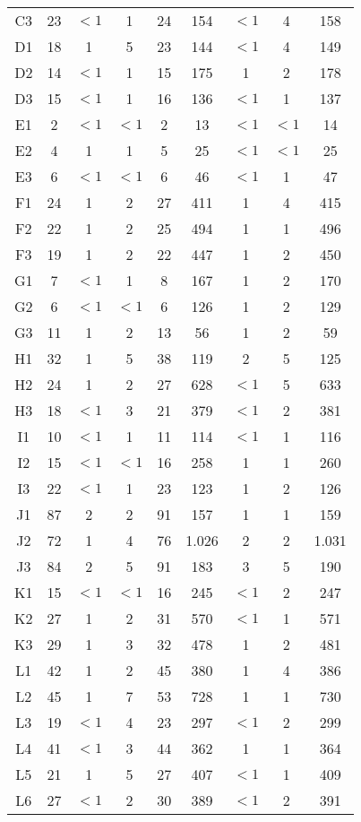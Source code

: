 \begin{center}
\begin{longtable}{ccccc|cccc}
C3&23&$<1$&1&24&154&$<1$&4&158\\
D1&18&1&5&23&144&$<1$&4&149\\
D2&14&$<1$&1&15&175&1&2&178\\
D3&15&$<1$&1&16&136&$<1$&1&137\\
E1&2&$<1$&$<1$&2&13&$<1$&$<1$&14\\
E2&4&1&1&5&25&$<1$&$<1$&25\\
E3&6&$<1$&$<1$&6&46&$<1$&1&47\\
F1&24&1&2&27&411&1&4&415\\
F2&22&1&2&25&494&1&1&496\\
F3&19&1&2&22&447&1&2&450\\
G1&7&$<1$&1&8&167&1&2&170\\
G2&6&$<1$&$<1$&6&126&1&2&129\\
G3&11&1&2&13&56&1&2&59\\
H1&32&1&5&38&119&2&5&125\\
H2&24&1&2&27&628&$<1$&5&633\\
H3&18&$<1$&3&21&379&$<1$&2&381\\
I1&10&$<1$&1&11&114&$<1$&1&116\\
I2&15&$<1$&$<1$&16&258&1&1&260\\
I3&22&$<1$&1&23&123&1&2&126\\
J1&87&2&2&91&157&1&1&159\\
J2&72&1&4&76&1.026&2&2&1.031\\
J3&84&2&5&91&183&3&5&190\\
K1&15&$<1$&$<1$&16&245&$<1$&2&247\\
K2&27&1&2&31&570&$<1$&1&571\\
K3&29&1&3&32&478&1&2&481\\
L1&42&1&2&45&380&1&4&386\\
L2&45&1&7&53&728&1&1&730\\
L3&19&$<1$&4&23&297&$<1$&2&299\\
L4&41&$<1$&3&44&362&1&1&364\\
L5&21&1&5&27&407&$<1$&1&409\\
L6&27&$<1$&2&30&389&$<1$&2&391\\
\end{longtable}
\end{center}

